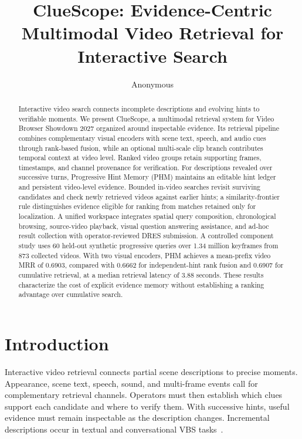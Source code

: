 \documentclass[runningheads]{llncs}
\begin{document}
\title{ClueScope: Evidence-Centric Multimodal Video Retrieval for Interactive Search}
\author{Anonymous}
\institute{}
\maketitle

\begin{abstract}
Interactive video search connects incomplete descriptions and evolving hints
to verifiable moments. We present ClueScope, a multimodal retrieval system
for Video Browser Showdown 2027 organized around inspectable evidence.
Its retrieval pipeline combines complementary visual encoders with scene text,
speech, and audio cues through rank-based fusion, while an optional multi-scale
clip branch contributes temporal context at video level. Ranked video groups
retain supporting frames, timestamps, and channel provenance for verification.
For descriptions revealed over successive turns, Progressive Hint Memory (PHM)
maintains an editable hint ledger and persistent video-level evidence.
Bounded in-video searches revisit surviving candidates and check newly retrieved
videos against earlier hints; a similarity-frontier rule distinguishes evidence
eligible for ranking from matches retained only for localization. A unified
workspace integrates spatial query composition, chronological browsing,
source-video playback, visual question answering assistance, and ad-hoc result
collection with operator-reviewed DRES submission. A controlled component study
uses 60 held-out synthetic progressive queries over 1.34 million keyframes from
873 collected videos. With two visual encoders, PHM achieves a mean-prefix video
MRR of 0.6903, compared with 0.6662 for independent-hint rank fusion and 0.6907
for cumulative retrieval, at a median retrieval latency of 3.88 seconds.
These results characterize the cost of explicit evidence memory without
establishing a ranking advantage over cumulative search.
\end{abstract}

\section{Introduction}
Interactive video retrieval connects partial scene descriptions to precise
moments. Appearance, scene text, speech, sound, and multi-frame events call for
complementary retrieval channels. Operators must then establish which clues
support each candidate and where to verify them. With successive hints, useful
evidence must remain inspectable as the description changes. Incremental
descriptions occur in textual and conversational VBS tasks~\cite{vbs2025results}.
\end{document}
